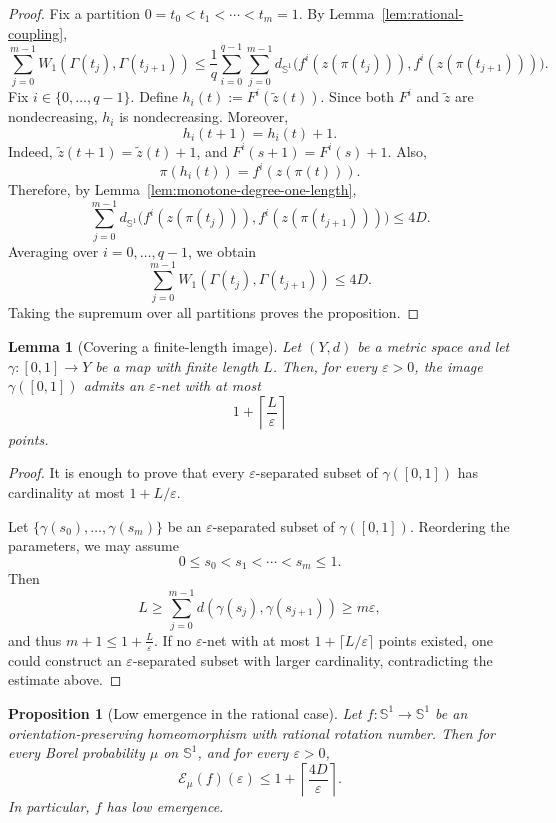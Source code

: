 \documentclass[12pt,a4paper,twoside]{article}
\theoremstyle{plain}
\newtheorem{proposition}[theorem]{Proposition}
\newtheorem{lemma}[theorem]{Lemma}
\theoremstyle{definition}
\newcommand{\cE}{{\mathcal E}}
\begin{document}
\begin{proof}
Fix a partition $0=t_0<t_1<\cdots<t_m=1$. By Lemma~\ref{lem:rational-coupling},
\[
\sum_{j=0}^{m-1}W_1(\Gamma(t_j),\Gamma(t_{j+1}))
\le
\frac1q\sum_{i=0}^{q-1}
\sum_{j=0}^{m-1}
d_{\mathbb S^1}
\bigl(
f^i(z(\pi(t_j))),
f^i(z(\pi(t_{j+1})))
\bigr).
\]
Fix \(i\in\{0,\dots,q-1\}\). Define $h_i(t):=F^i(\widetilde z(t))$. Since both \(F^i\) and \(\widetilde z\) are nondecreasing, \(h_i\) is
nondecreasing. Moreover,
\[
h_i(t+1)=h_i(t)+1.
\]
Indeed, \(\widetilde z(t+1)=\widetilde z(t)+1\), and \(F^i(s+1)=F^i(s)+1\).
Also,
\[
\pi(h_i(t))
=
f^i(z(\pi(t))).
\]
Therefore, by Lemma~\ref{lem:monotone-degree-one-length},
\[
\sum_{j=0}^{m-1}
d_{\mathbb S^1}
\bigl(
f^i(z(\pi(t_j))),
f^i(z(\pi(t_{j+1})))
\bigr)
\le
4D.
\]
Averaging over \(i=0,\dots,q-1\), we obtain
\[
\sum_{j=0}^{m-1}W_1(\Gamma(t_j),\Gamma(t_{j+1}))
\le
4D.
\]
Taking the supremum over all partitions proves the proposition.
\end{proof}

\begin{lemma}[Covering a finite-length image]
\label{lem:finite-length-cover}
Let \((Y,d)\) be a metric space and let \(\gamma:[0,1]\to Y\) be a map with
finite length \(L\). Then, for every \(\varepsilon>0\), the image
\(\gamma([0,1])\) admits an \(\varepsilon\)-net with at most
\[
1+\left\lceil\frac{L}{\varepsilon}\right\rceil
\]
points.
\end{lemma}

\begin{proof}
It is enough to prove that every \(\varepsilon\)-separated subset of
\(\gamma([0,1])\) has cardinality at most \(1+L/\varepsilon\).

Let $\{\gamma(s_0),\dots,\gamma(s_m)\}$ be an \(\varepsilon\)-separated subset of \(\gamma([0,1])\). Reordering the parameters, we may assume
\[
0\le s_0<s_1<\cdots<s_m\le1.
\]
Then
\[
L
\ge
\sum_{j=0}^{m-1}d(\gamma(s_j),\gamma(s_{j+1}))
\ge
m\varepsilon,
\]
and thus $m+1\le 1+\frac{L}{\varepsilon}$.
If no \(\varepsilon\)-net with at most
\(1+\lceil L/\varepsilon\rceil\) points existed, one could construct an
\(\varepsilon\)-separated subset with larger cardinality, contradicting the
estimate above.
\end{proof}

\begin{proposition}[Low emergence in the rational case]
\label{prop:circle-rational-low}
Let \(f:\mathbb S^1\to\mathbb S^1\) be an orientation-preserving
homeomorphism with rational rotation number. Then for every Borel probability
\(\mu\) on \(\mathbb S^1\), and for every \(\varepsilon>0\),
\[
\cE_\mu(f)(\varepsilon)
\le
1+\left\lceil\frac{4D}{\varepsilon}\right\rceil.
\]
In particular, \(f\) has low emergence.
\end{proposition}
\end{document}
